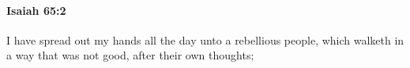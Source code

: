 
		\paragraph{Isaiah 65:2} %
			\label{ISAIAH-65-2}

			I have spread out my hands all the day unto a rebellious people, which walketh in a way that was not good, after their own thoughts;


